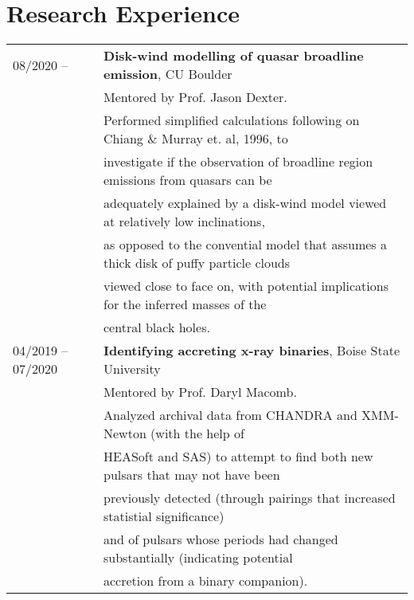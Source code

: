 \documentclass[11pt]{article}
\begin{document}
\section{Research Experience}
\begin{tabular}{ll}
08/2020 -- & 	\textbf{Disk-wind modelling of quasar broadline emission}, CU Boulder \vspace{1mm} \\
			&	Mentored by Prof. Jason Dexter.\vspace{1mm} \\
      & Performed simplified calculations following on Chiang \& Murray et. al, 1996, to \\
      & investigate if the observation of broadline region emissions from quasars can be \\
      & adequately explained by a disk-wind model viewed at relatively low inclinations, \\
      & as opposed to the convential model that assumes a thick disk of puffy particle clouds \\
      & viewed close to face on, with potential implications for the inferred masses of the \\
      & central black holes. \vspace{1mm}\\
04/2019 -- 07/2020		& 	\textbf{Identifying accreting x-ray binaries}, Boise State University \vspace{1mm} \\
			&	Mentored by Prof. Daryl Macomb.\vspace{1mm} \\
      & Analyzed archival data from CHANDRA and XMM-Newton (with the help of \\
      & HEASoft and SAS) to attempt to find both new pulsars that may not have been\\
      & previously detected (through pairings that increased statistial significance) \\
      & and of pulsars whose periods had changed substantially (indicating potential \\
      & accretion from a binary companion).\\

\end{tabular}
\end{document}
